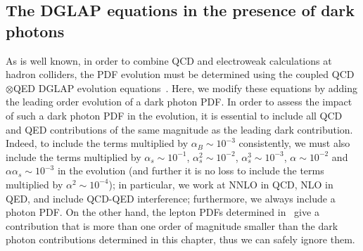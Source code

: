 \documentclass[withindex,glossary]{cam-thesis}
\begin{document}
\subsection{The DGLAP equations in the presence of dark photons}
\label{subsec:dglap}


As is well known, in order to combine  QCD and electroweak
calculations at hadron colliders,
the PDF evolution must be determined using the coupled QCD$\otimes$QED
DGLAP
evolution
equations~\cite{DeRujula:1979grv,Kripfganz:1988bd,Blumlein:1989gk}.
Here, we modify these equations by adding the leading order evolution of a dark photon PDF. 
%
In order to assess the impact of such a dark photon PDF in the
evolution, it is essential to include all QCD and QED contributions
of the same magnitude as the leading dark contribution. Indeed, to
include the terms multiplied by $\alpha_B \sim 10^{-3}$ consistently,
we must also include the terms multiplied by $\alpha_s \sim 10^{-1}$,
$\alpha_s^2 \sim 10^{-2}$, $\alpha_s^3 \sim 10^{-3}$, $\alpha \sim
10^{-2}$ and $\alpha\alpha_s \sim 10^{-3}$
in the evolution (and further it is no loss to include the terms
multiplied by $\alpha^2 \sim 10^{-4}$);
in particular, we work at NNLO in QCD, NLO in QED, and include QCD-QED
interference;
furthermore, we always include a photon PDF. On the other hand, the
lepton PDFs determined
in~\cite{Buonocore:2020erb,Buonocore:2020nai,Buonocore:2021bsf,Harland-Lang:2021zvr}
give a contribution that is more than one order of magnitude smaller
than the dark photon
contributions determined in this chapter, thus we can safely ignore them.
\end{document}
